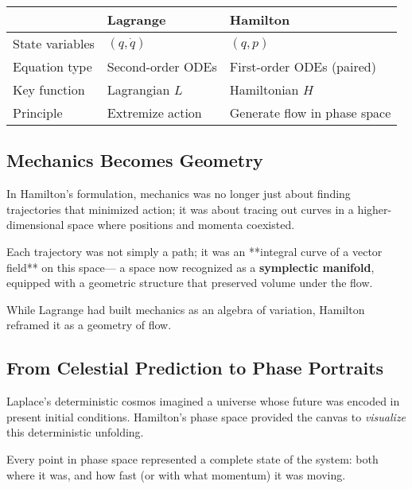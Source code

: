 \begin{tcolorbox}[colback=gray!5!white, colframe=black, title=\textbf{Sidebar: The Shift from Lagrange to Hamilton}, fonttitle=\bfseries, arc=1.5mm, boxrule=0.4pt]

\begin{tabular}{>{\raggedright}p{3.5cm} >{\raggedright}p{5.5cm} >{\raggedright\arraybackslash}p{5.5cm}}
 & \textbf{Lagrange} & \textbf{Hamilton} \\
\midrule
State variables & \( (q, \dot{q}) \) & \( (q, p) \) \\
Equation type & Second-order ODEs & First-order ODEs (paired) \\
Key function & Lagrangian \( L \) & Hamiltonian \( H \) \\
Principle & Extremize action & Generate flow in phase space
\end{tabular}

\end{tcolorbox}

\bigskip

\subsection*{Mechanics Becomes Geometry}

In Hamilton’s formulation, mechanics was no longer just about finding trajectories that minimized action;  
it was about tracing out curves in a higher-dimensional space where positions and momenta coexisted.

Each trajectory was not simply a path; it was an **integral curve of a vector field** on this space—  
a space now recognized as a \textbf{symplectic manifold}, equipped with a geometric structure that preserved volume under the flow.

While Lagrange had built mechanics as an algebra of variation,  
Hamilton reframed it as a geometry of flow.

\bigskip

\subsection*{From Celestial Prediction to Phase Portraits}

Laplace’s deterministic cosmos imagined a universe whose future was encoded in present initial conditions.  
Hamilton’s phase space provided the canvas to \emph{visualize} this deterministic unfolding.

Every point in phase space represented a complete state of the system:  
both where it was, and how fast (or with what momentum) it was moving.


